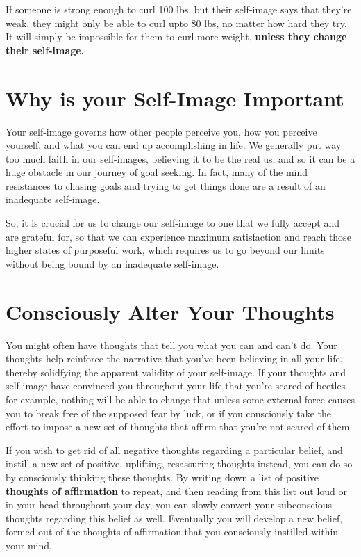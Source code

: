 \documentclass[
]{book}
\begin{document}
If someone is strong enough to curl 100 lbs, but their self-image says that they're weak, they might only be able to curl upto 80 lbs, no matter how hard they try. It will simply be impossible for them to curl more weight, \textbf{unless they change their self-image. \citep{hypnosis}}

\hypertarget{why-is-your-self-image-important}{%
\section{Why is your Self-Image Important}\label{why-is-your-self-image-important}}

Your self-image governs how other people perceive you, how you perceive yourself, and what you can end up accomplishing in life. We generally put way too much faith in our self-images, believing it to be the real us, and so it can be a huge obstacle in our journey of goal seeking. In fact, many of the mind resistances to chasing goals and trying to get things done are a result of an inadequate self-image.

So, it is crucial for us to change our self-image to one that we fully accept and are grateful for, so that we can experience maximum satisfaction and reach those higher states of purposeful work, which requires us to go beyond our limits without being bound by an inadequate self-image.

\hypertarget{consciously-alter-your-thoughts}{%
\section{Consciously Alter Your Thoughts}\label{consciously-alter-your-thoughts}}

You might often have thoughts that tell you what you can and can't do. Your thoughts help reinforce the narrative that you've been believing in all your life, thereby solidfying the apparent validity of your self-image. If your thoughts and self-image have convinced you throughout your life that you're scared of beetles for example, nothing will be able to change that unless some external force causes you to break free of the supposed fear by luck, or if you consciously take the effort to impose a new set of thoughts that affirm that you're not scared of them.

If you wish to get rid of all negative thoughts regarding a particular belief, and instill a new set of positive, uplifting, resassuring thoughts instead, you can do so by consciously thinking these thoughts. By writing down a list of positive \textbf{thoughts of affirmation} to repeat, and then reading from this list out loud or in your head throughout your day, you can slowly convert your subconscious thoughts regarding this belief as well. Eventually you will develop a new belief, formed out of the thoughts of affirmation that you consciously instilled within your mind.
\end{document}
